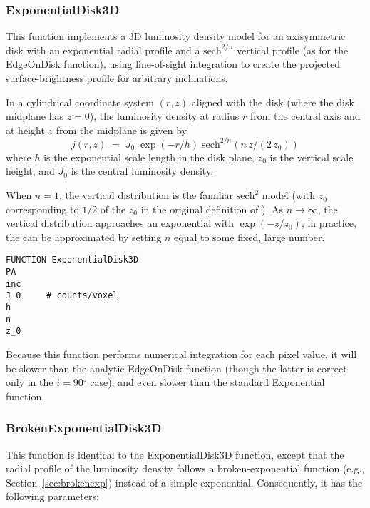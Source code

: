 \documentclass[10pt,a4paper,article]{memoir}
\newcommand{\arcdeg}{\ensuremath{^{\circ}}}
\begin{document}
\subsubsection{ExponentialDisk3D}

This function implements a 3D luminosity density model for an
axisymmetric disk with an exponential radial profile and a
${\mathrm{sech}}^{2/n}$ vertical profile (as for the EdgeOnDisk
function), using line-of-sight integration to create the projected
surface-brightness profile for arbitrary inclinations.

In a cylindrical coordinate system $(r, z)$ aligned with the disk (where the disk
midplane has $z = 0$), the luminosity density at radius $r$ from 
the central axis and
at height $z$ from the midplane is given by
\begin{equation}
j(r,z) \; = \; J_{0} \; \exp(-r/h) \; {\mathrm{sech}}^{2/n} (n \, z/(2 \, z_{0}))
\end{equation}
where $h$ is the exponential scale length in the disk plane, $z_{0}$ is the vertical
scale height, and $J_{0}$ is the central luminosity density.

When $n = 1$, the vertical distribution is the familiar $\mathrm{sech}^2$ model
(with $z_{0}$ corresponding to $1/2$ of the $z_0$ in the original definition of
\citet{vdk81}). As $n \rightarrow \infty$, the vertical distribution approaches
an exponential with $\exp(-z/z_{0})$; in practice, the can be approximated by
setting $n$ equal to some fixed, large number.


\begin{verbatim}
FUNCTION ExponentialDisk3D
PA
inc
J_0     # counts/voxel
h
n
z_0
\end{verbatim}

Because this function performs numerical integration for each pixel value, it will be
slower than the analytic EdgeOnDisk function (though the latter is correct only in
the $i= 90\arcdeg$ case), and even slower than the standard Exponential function.



\subsubsection{BrokenExponentialDisk3D}

This function is identical to the ExponentialDisk3D function, except
that the radial profile of the luminosity density follows a
broken-exponential function (e.g., Section~\ref{sec:brokenexp}) instead
of a simple exponential. Consequently, it has the following parameters:
\end{document}

